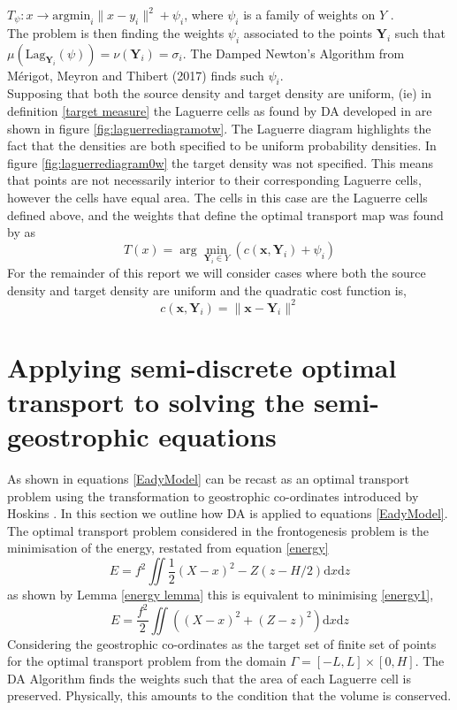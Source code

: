 $T_\psi: x \rightarrow \text{argmin}_i\| x - y_i \|^2 + \psi_i$, where $\psi_i$ is a family of weights on $Y$ \cite{Merigot2017}.\\
\linebreak
 The problem is then finding the weights $\psi_i$ associated to the points $\bm{Y}_i$ such that $\mu (\text{Lag}_{\bm{Y}_i}(\psi)) = \nu(\bm{Y}_i) = \sigma_i$. The Damped Newton's Algorithm from M\'{e}rigot, Meyron and Thibert (2017) \cite{Merigot2017} finds such $\psi_i$.
 \\
 \linebreak 
 Supposing that both the source density and target density are uniform, (ie) in definition \ref{target measure} the Laguerre cells as found by DA developed in \cite{Merigot2017} are shown in figure \ref{fig:laguerrediagramotw}. The Laguerre diagram highlights the fact that the densities are both specified to be uniform probability densities. In figure \ref{fig:laguerrediagram0w} the target density was not specified. This means that points are not necessarily interior to their corresponding Laguerre cells, however the cells have equal area. The cells in this case are the Laguerre cells defined above, and the weights that define the optimal transport map was found by \cite{Merigot2017} as
 \begin{equation*}
 T(x) = \arg\min_{\bm{Y}_i\in Y}\left(c(\bm{x},\bm{Y}_i) + \psi_i\right)
 \end{equation*}
For the remainder of this report we will consider cases where both the source density and target density are uniform and the quadratic cost function is,
\begin{equation*}
	c(\bm{x},\bm{Y}_i) = \| \bm{x} - \bm{Y}_i \|^2
\end{equation*}
\section{Applying semi-discrete optimal transport to solving the semi-geostrophic equations}
As shown in \cite{Cullen2006a} equations \ref{EadyModel} can be recast as an optimal transport problem using the transformation to geostrophic co-ordinates introduced by Hoskins \cite{Hoskins1975}. In this section we outline how DA is applied to equations \ref{EadyModel}.
\\
\linebreak
The optimal transport problem considered in the frontogenesis problem is the minimisation of the energy, restated from equation \ref{energy}
\begin{equation}
E = f^2 \iint \frac{1}{2}\left(X-x\right)^2 - Z\left(z - H/2\right)\textrm{d}x\textrm{d}z
\end{equation}
as shown by Lemma \ref{energy lemma} this is equivalent to minimising \ref{energy1},
\begin{equation}
E = \frac{f^2}{2} \iint \left(\left(X-x\right)^2 + \left(Z - z\right)^2\right)\textrm{d}x\textrm{d}z
\end{equation}
Considering the geostrophic co-ordinates as the target set of finite set of points for the optimal transport problem from the domain $\Gamma = [-L,L] \times [0,H]$. The DA Algorithm finds the weights such that the area of each Laguerre cell is preserved. Physically, this amounts to the condition that the volume is conserved.
